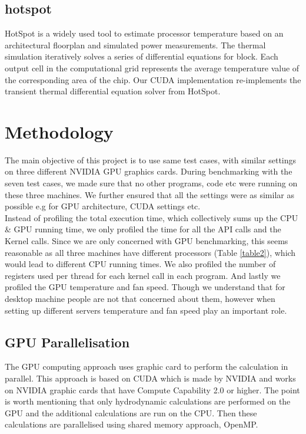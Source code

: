 \documentclass[paper=a4, fontsize=11pt]{scrartcl}
\numberwithin{equation}{section}		%
\numberwithin{figure}{section}			%
\numberwithin{table}{section}				%
\begin{document}
\subsection{hotspot}
HotSpot is a widely used tool to estimate processor temperature based on an architectural floorplan and simulated power measurements. The thermal simulation iteratively solves a series of differential equations for block. Each output cell in the computational grid represents the average temperature value of the corresponding area of the chip. Our CUDA implementation re-implements the transient thermal differential equation solver from HotSpot.






\newpage
\section{Methodology}
The main objective of this project is to use same test cases, with similar settings on three different NVIDIA GPU graphics cards. During benchmarking with the seven test cases, we made sure that no other programs, code etc were running on these three machines. We further ensured that all the settings were as similar as possible e.g for GPU architecture, CUDA settings etc.\\


Instead of profiling the total execution time, which collectively sums up the CPU \& GPU running time, we only profiled the time for all the API calls and the Kernel calls. Since we are only concerned with GPU benchmarking, this seems reasonable as all three machines have different processors (Table \ref{table2}), which would lead to different CPU running times. We also profiled the number of registers used per thread for each kernel call in each program. And lastly we profiled the GPU temperature and fan speed. Though we understand that for desktop machine people are not that concerned about them, however when setting up different servers temperature and fan speed play an important role.  

\subsection{GPU Parallelisation}
The GPU computing approach uses graphic card to perform the calculation in parallel. This approach is based on CUDA which is made by NVIDIA and works on NVIDIA graphic cards that have Compute Capability 2.0 or higher. The point is worth mentioning that only hydrodynamic calculations are performed on the GPU and the additional calculations are run on the CPU. Then these calculations are parallelised using shared memory approach, OpenMP.
\end{document}
